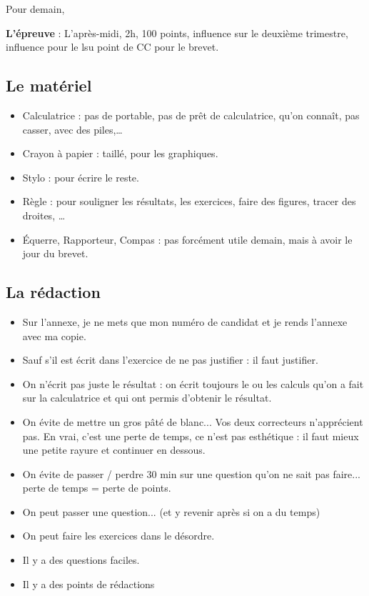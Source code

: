 \documentclass[12pt]{article}
\begin{document}
Pour demain,

\textbf{L'épreuve} : L'après-midi, 2h, 100 points, influence sur le deuxième trimestre, influence pour le lsu point de CC pour le brevet.

\subsection*{Le matériel}

\begin{itemize}
    \item Calculatrice : pas de portable, pas de prêt de calculatrice, qu'on connaît, pas casser, avec des piles,\dots
    \item Crayon à papier : taillé, pour les graphiques.
    \item Stylo : pour écrire le reste.
    \item Règle : pour souligner les résultats, les exercices, faire des figures, tracer des droites, \dots
    \item Équerre, Rapporteur, Compas : pas forcément utile demain, mais à avoir le jour du brevet. 
\end{itemize}

\subsection*{La rédaction}

\begin{itemize}
    \item Sur l'annexe, je ne mets que mon numéro de candidat et je rends l'annexe avec ma copie.
    \item Sauf s'il est écrit dans l'exercice de ne pas justifier : il faut justifier.
    \item On n'écrit pas juste le résultat : on écrit toujours le ou les calculs qu'on a fait sur la calculatrice et qui ont permis d'obtenir le résultat.
    \item On évite de mettre un gros pâté de blanc... Vos deux correcteurs n'apprécient pas. En vrai, c'est une perte de temps, ce n'est pas esthétique : il faut mieux une petite rayure et continuer en dessous.
    \item On évite de passer / perdre 30 min sur une question qu'on ne sait pas faire... perte de temps = perte de points.
    \item On peut passer une question... (et y revenir après si on a du temps)
    \item On peut faire les exercices dans le désordre.
    \item Il y a des questions faciles.
    \item Il y a des points de rédactions
\end{itemize}
\end{document}

